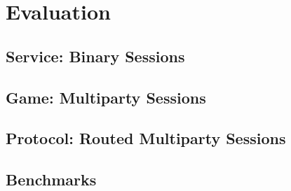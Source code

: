 \chapter{Evaluation}

\section{ Service: Binary Sessions}

\section{ Game: Multiparty Sessions}

\section{ Protocol: Routed Multiparty Sessions}

\section{Benchmarks}